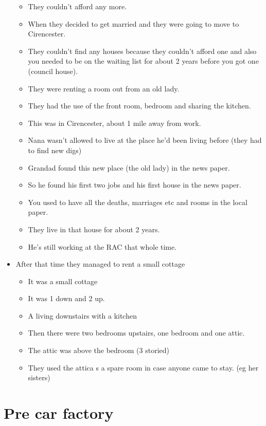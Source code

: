 \documentclass[10pt,twocolumn,letterpaper]{article}
\begin{document}
\begin{itemize}
\begin{itemize}
        \item They couldn't afford any more.
        \item When they decided to get married and they were going to move to Cirencester.
        \item They couldn't find any houses because they couldn't afford one and also you needed to be on the waiting list for about 2 years before you got one (council house).
        \item They were renting a room out from an old lady.
        \item They had the use of the front room, bedroom and sharing the kitchen.
        \item This was in Cirencester, about 1 mile away from work.
        \item Nana wasn't allowed to live at the place he'd been living before (they had to find new digs)
        \item Grandad found this new place (the old lady) in the news paper.
        \item So he found his first two jobs and his first house in the news paper.
        \item You used to have all the deaths, marriages etc and rooms in the local paper.
        \item They live in that house for about 2 years.
        \item He's still working at the RAC that whole time.
    \end{itemize}
    \item After that time they managed to rent a small cottage
    \begin{itemize}
        \item It was a small cottage
        \item It was 1 down and 2 up.
        \item A living downstairs with a kitchen
        \item Then there were two bedrooms upstairs, one bedroom and one attic.
        \item The attic was above the bedroom (3 storied)
        \item They used the attica s a spare room in case anyone came to stay. (eg her sisters)
    \end{itemize}


\end{itemize}



\section{Pre car factory}
\end{document}
